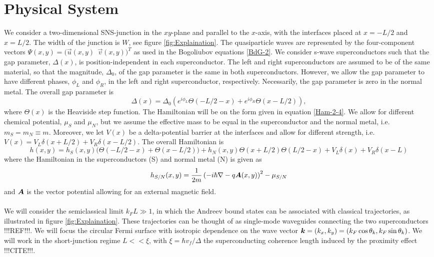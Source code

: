 \chapter{Physical System}
\label{sec:PhysicalSystem}
We consider a two-dimensional SNS-junction in the $xy$-plane and parallel to the $x$-axis, with the interfaces placed at $x=-L/2$ and $x=L/2$. The width of the junction is $W$, see figure \ref{fig:Explaination}. The quasiparticle waves are represented by the four-component vectors $\Psi(x,y) = \big(\vec{u}(x,y) \ \ \vec{v}(x,y) \big)^T$ as used in the Bogoliubov equations \eqref{BdG-2}. We consider s-wave superconductors such that the gap parameter, $\Delta(x)$, is position-independent in each superconductor. The left and right superconductors are assumed to be of the same material, so that the magnitude, $\Delta_0$, of the gap parameter is the same in both superconductors. However, we allow the gap parameter to have different phases, $\phi_L$ and $\phi_R$, in the left and right superconductor, respectively. Necessarily, the gap parameter is zero in the normal metal. The overall gap parameter is
\begin{equation}
    \Delta(x) = \Delta_0\left( e^{i\phi_L}\Theta(-L/2-x) + e^{i\phi_R}\Theta(x-L/2)\right),
\end{equation}
where $\Theta(x)$ is the Heaviside step function. 
The Hamiltonian will be on the form given in equation \eqref{Ham-2-4}. We allow for different chemical potential, $\mu_S$ and $\mu_N$, but we assume the effective mass to be equal in the superconductor and the normal metal, i.e. $m_S = m_N \equiv m$. Moreover, we let $V(x)$ be a delta-potential barrier at the interfaces and allow for different strength, i.e. $V(x) = V_L\delta(x+L/2) + V_R\delta(x-L/2)$. The overall Hamiltonian is
\begin{equation}
    h(x,y) = h_S(x,y)\big(\Theta(-L/2-x) + \Theta(x-L/2) \big) + h_N(x,y)\Theta(x+L/2)\Theta(L/2-x) + V_L\delta(x) + V_R\delta(x-L)
\label{Ham-3}
\end{equation}
where the Hamiltonian in the superconductors (S) and normal metal (N) is given as
\begin{equation}
    h_{S/N}(x,y) = \frac{1}{2m}\left(-i\hbar\nabla-q\boldsymbol{A}(x,y)\right)^2-\mu_{S/N}
\end{equation} 
and $\boldsymbol{A}$ is the vector potential allowing for an external magnetic field.
\\
\\
We will consider the semiclassical limit $k_FL \gg 1$, in which the Andreev bound states can be associated with classical trajectories, as illustrated in figure \ref{fig:Explaination}. These trajectories can be thought of as single-mode waveguides connecting the two superconductors !!!REF!!!. We will focus the circular Fermi surface with isotropic dependence on the wave vector $\boldsymbol{k} = (k_x,k_y) = (k_F\cos\theta_k,k_F\sin\theta_k)$. We will work in the short-junction regime $L<<\xi$, with $\xi=\hbar v_f/\Delta$ the superconducting coherence length induced by the proximity effect !!!CITE!!!.
